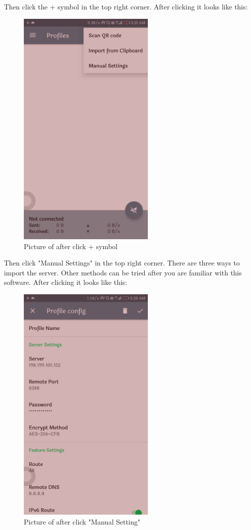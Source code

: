 \documentclass[12pt]{wx672article}
\begin{document}
\begin{itemize}
Then click the + symbol in the top right corner. After clicking it looks like this:
\begin{figure}[!htb]
\centering
\includegraphics[width=250px]{./images/androidPhone2.jpg}
\caption{\label{fig:orgcd8a967}
Picture of after click + symbol}
\end{figure}

Then click "Manual Settings" in the top right corner. There are three ways to import the
server. Other methods can be tried after you are familiar with this software. After
clicking it looks like this:
\begin{figure}[!htb]
\centering
\includegraphics[width=250px]{./images/androidPhone3.jpg}
\caption{\label{fig:org85f908c}
Picture of after click "Manual Setting"}
\end{figure}


\end{itemize}
\end{document}

